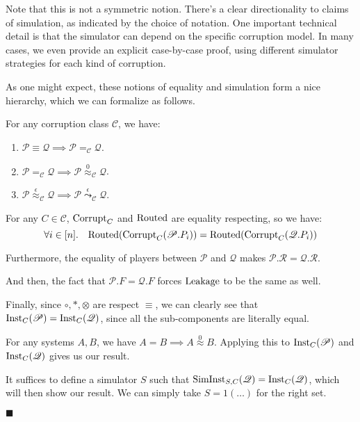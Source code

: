 Note that this is not a symmetric notion.
There's a clear directionality to claims of simulation,
as indicated by the choice of notation.
One important technical detail is that the simulator can
depend on the specific corruption model.
In many cases, we even provide an explicit case-by-case proof,
using different simulator strategies for each kind of corruption.

As one might expect, these notions of equality and simulation
form a nice hierarchy, which we can formalize as follows.

\begin{theorem}
  \label{thm:equality_hierarchy}
For any corruption class $\mathscr{C}$, we have:
\begin{enumerate}
\item $\mathscr{P} \equiv \mathscr{Q} \implies \mathscr{P} =_\mathscr{C} \mathscr{Q}$.
\item $\mathscr{P} =_{\mathscr{C}} \mathscr{Q} \implies \mathscr{P} \overset{0}{\approx}_\mathscr{C} \mathscr{Q}$.
\item $\mathscr{P} \overset{\epsilon}{\approx}_{\mathscr{C}} \mathscr{Q} \implies \mathscr{P} \overset{\epsilon}{\leadsto}_\mathscr{C} \mathscr{Q}$.
\end{enumerate}


For any $C \in \mathscr{C}$, $\text{Corrupt}_{C}$ and $\text{Routed}$ are equality respecting,
so we have:
$$
\forall i \in [n].\quad \text{Routed}(\text{Corrupt}_C(\mathscr{P}.P_i)) = 
\text{Routed}(\text{Corrupt}_C(\mathscr{Q}.P_i))
$$

Furthermore, the equality of players between $\mathscr{P}$ and $\mathscr{Q}$
makes $\mathscr{P}.\mathcal{R} = \mathscr{Q}.\mathcal{R}$.

And then, the fact that $\mathscr{P}.F = \mathscr{Q}.F$ forces $\text{Leakage}$
to be the same as well.

Finally, since $\circ, *, \otimes$ are respect $\equiv$, we
can clearly see that $\text{Inst}_C(\mathscr{P}) = \text{Inst}_C(\mathscr{Q})$,
since all the sub-components are literally equal.

 For any systems $A, B$, we have $A = B \implies A \overset{0}{\approx} B$.
Applying this to $\text{Inst}_C(\mathscr{P})$ and $\text{Inst}_C(\mathscr{Q})$
gives us our result.

 It suffices to define a simulator $S$ such that
$\text{SimInst}_{S, C}(\mathscr{Q}) = \text{Inst}_C(\mathscr{Q})$,
which will then show our result.
We can simply take $S = 1(\ldots)$ for the right set.

$\blacksquare$
\end{theorem}

